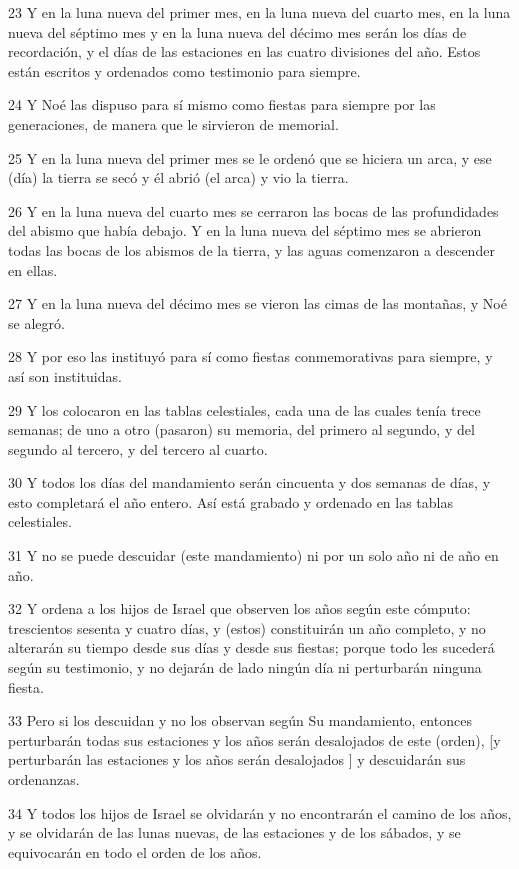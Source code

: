 \par 23 Y en la luna nueva del primer mes, en la luna nueva del cuarto mes, en la luna nueva del séptimo mes y en la luna nueva del décimo mes serán los días de recordación, y el días de las estaciones en las cuatro divisiones del año. Estos están escritos y ordenados como testimonio para siempre.
\par 24 Y Noé las dispuso para sí mismo como fiestas para siempre por las generaciones, de manera que le sirvieron de memorial.
\par 25 Y en la luna nueva del primer mes se le ordenó que se hiciera un arca, y ese (día) la tierra se secó y él abrió (el arca) y vio la tierra.
\par 26 Y en la luna nueva del cuarto mes se cerraron las bocas de las profundidades del abismo que había debajo. Y en la luna nueva del séptimo mes se abrieron todas las bocas de los abismos de la tierra, y las aguas comenzaron a descender en ellas.
\par 27 Y en la luna nueva del décimo mes se vieron las cimas de las montañas, y Noé se alegró.
\par 28 Y por eso las instituyó para sí como fiestas conmemorativas para siempre, y así son instituidas.
\par 29 Y los colocaron en las tablas celestiales, cada una de las cuales tenía trece semanas; de uno a otro (pasaron) su memoria, del primero al segundo, y del segundo al tercero, y del tercero al cuarto.
\par 30 Y todos los días del mandamiento serán cincuenta y dos semanas de días, y esto completará el año entero. Así está grabado y ordenado en las tablas celestiales.
\par 31 Y no se puede descuidar (este mandamiento) ni por un solo año ni de año en año.
\par 32 Y ordena a los hijos de Israel que observen los años según este cómputo: trescientos sesenta y cuatro días, y (estos) constituirán un año completo, y no alterarán su tiempo desde sus días y desde sus fiestas; porque todo les sucederá según su testimonio, y no dejarán de lado ningún día ni perturbarán ninguna fiesta.
\par 33 Pero si los descuidan y no los observan según Su mandamiento, entonces perturbarán todas sus estaciones y los años serán desalojados de este (orden), [y perturbarán las estaciones y los años serán desalojados ] y descuidarán sus ordenanzas.
\par 34 Y todos los hijos de Israel se olvidarán y no encontrarán el camino de los años, y se olvidarán de las lunas nuevas, de las estaciones y de los sábados, y se equivocarán en todo el orden de los años.
